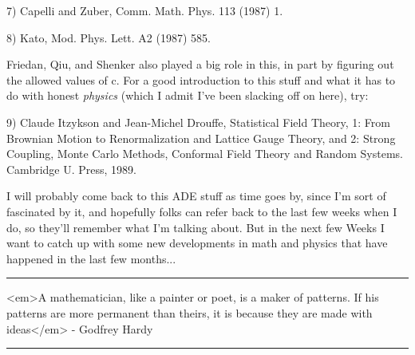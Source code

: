 7) Capelli and Zuber, Comm. Math. Phys. 113 (1987) 1.

8) Kato, Mod. Phys. Lett. A2 (1987) 585.

Friedan, Qiu, and Shenker also played a big role in this, in part by
figuring out the allowed values of c.  For a good introduction to this
stuff and what it has to do with honest \emph{physics} (which I admit I've been
slacking off on here), try:

9) Claude Itzykson and Jean-Michel Drouffe, Statistical Field Theory, 
1: From Brownian Motion to Renormalization and Lattice Gauge Theory, and
2: Strong Coupling, Monte Carlo Methods, Conformal Field Theory and
Random Systems.  Cambridge U. Press, 1989. 

I will probably come back to this ADE stuff as time goes by, since
I'm sort of fascinated by it, and hopefully folks can refer back to
the last few weeks when I do, so they'll remember what I'm talking
about.  But in the next few Weeks I want to catch up with some new
developments in math and physics that have happened in the last few
months... 

\par\noindent\rule{\textwidth}{0.4pt}
<em>A mathematician, like a painter or poet, is a maker of
patterns.  If his patterns are more permanent than theirs, it is because
they are made with ideas</em> - Godfrey Hardy


\par\noindent\rule{\textwidth}{0.4pt}

